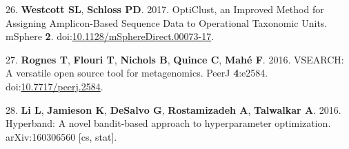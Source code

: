 \documentclass[11pt,]{article}
\begin{document}
\hypertarget{ref-westcott_opticlust_2017}{}
26. \textbf{Westcott SL}, \textbf{Schloss PD}. 2017. OptiClust, an
Improved Method for Assigning Amplicon-Based Sequence Data to
Operational Taxonomic Units. mSphere \textbf{2}.
doi:\href{https://doi.org/10.1128/mSphereDirect.00073-17}{10.1128/mSphereDirect.00073-17}.

\hypertarget{ref-rognes_vsearch_2016}{}
27. \textbf{Rognes T}, \textbf{Flouri T}, \textbf{Nichols B},
\textbf{Quince C}, \textbf{Mahé F}. 2016. VSEARCH: A versatile open
source tool for metagenomics. PeerJ \textbf{4}:e2584.
doi:\href{https://doi.org/10.7717/peerj.2584}{10.7717/peerj.2584}.

\hypertarget{ref-li_hyperband:_2016}{}
28. \textbf{Li L}, \textbf{Jamieson K}, \textbf{DeSalvo G},
\textbf{Rostamizadeh A}, \textbf{Talwalkar A}. 2016. Hyperband: A novel
bandit-based approach to hyperparameter optimization. arXiv:160306560
{[}cs, stat{]}.
\end{document}
